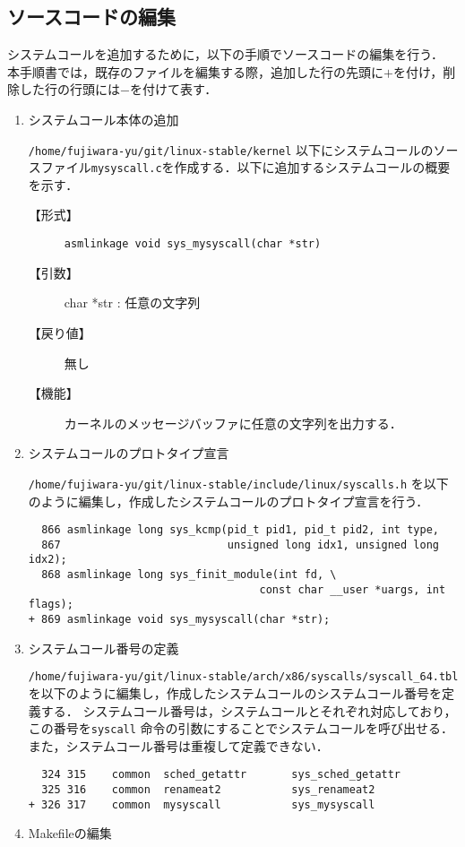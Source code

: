\documentclass[12pt]{jsarticle}
\begin{document}
\subsection{ソースコードの編集}
システムコールを追加するために，以下の手順でソースコードの編集を行う．
本手順書では，既存のファイルを編集する際，追加した行の先頭に$+$を付け，削除した行の行頭には$-$を付けて表す．
\begin{enumerate}

\item システムコール本体の追加

\verb|/home/fujiwara-yu/git/linux-stable/kernel| 以下にシステムコールのソースファイル\verb|mysyscall.c|を作成する．以下に追加するシステムコールの概要を示す．
\begin{description}
\item[【形式】]\verb|asmlinkage void sys_mysyscall(char *str)|

\item[【引数】]char *str : 任意の文字列

\item [【戻り値】]無し

\item [【機能】]カーネルのメッセージバッファに任意の文字列を出力する．

\end{description}

\item システムコールのプロトタイプ宣言

\verb|/home/fujiwara-yu/git/linux-stable/include/linux/syscalls.h| を以下のように編集し，作成したシステムコールのプロトタイプ宣言を行う．
\begin{verbatim}
  866 asmlinkage long sys_kcmp(pid_t pid1, pid_t pid2, int type,
  867                          unsigned long idx1, unsigned long idx2);
  868 asmlinkage long sys_finit_module(int fd, \ 
                                    const char __user *uargs, int flags);
+ 869 asmlinkage void sys_mysyscall(char *str);
\end{verbatim}
\item システムコール番号の定義

\verb|/home/fujiwara-yu/git/linux-stable/arch/x86/syscalls/syscall_64.tbl| を以下のように編集し，作成したシステムコールのシステムコール番号を定義する．
システムコール番号は，システムコールとそれぞれ対応しており，この番号を\verb|syscall| 命令の引数にすることでシステムコールを呼び出せる．
また，システムコール番号は重複して定義できない．
\begin{verbatim}
  324 315    common  sched_getattr       sys_sched_getattr
  325 316    common  renameat2           sys_renameat2
+ 326 317    common  mysyscall           sys_mysyscall
\end{verbatim}
\item Makefileの編集


\end{enumerate}
\end{document}
